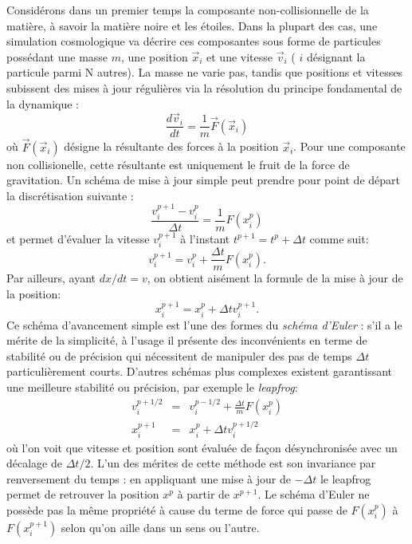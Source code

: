 Considérons dans un premier temps la composante non-collisionnelle de la matière, à savoir la matière noire et les étoiles. Dans la plupart des cas, une simulation cosmologique va décrire ces composantes sous forme de particules possédant une masse $m$, une position $\vec x_i$ et une vitesse $\vec v_i$ ( $i$ désignant la particule parmi N autres). La masse ne varie pas, tandis que positions et vitesses subissent des mises à jour régulières via la résolution du principe fondamental de la dynamique :
\begin{equation}
\frac{d \vec v_i}{dt}=\frac{1}{m} \vec{F}(\vec x_i)
\end{equation}
où $\vec{F}(\vec x_i)$ désigne la résultante des forces à la position $\vec x_i$. Pour une composante non collisionelle, cette résultante est uniquement le fruit de la force de gravitation. Un schéma de mise à jour simple peut prendre pour point de départ la discrétisation suivante :
\begin{equation}
\frac{v_i^{p+1}-v_i^{p}}{\Delta t}=\frac{1}{m} {F}(x_i^p)
\end{equation}
et permet d'évaluer la vitesse $v_i^{p+1}$ à l'instant $t^{p+1}=t^p+\Delta t$ comme suit:
\begin{equation}
v_i^{p+1}=v_i^{p}+\frac{\Delta t}{m} {F}(x_i^p).
\end{equation}
Par ailleurs, ayant $dx/dt=v$, on obtient aisément la formule de la mise à jour de la position:
\begin{equation}
x^{p+1}_i=x^{p}_i+\Delta t v_i^{p+1}.
\end{equation}
Ce schéma d'avancement simple est l'une des formes du \textit{schéma d'Euler} : s'il a le mérite de la simplicité, à l'usage il présente des inconvénients en terme de stabilité ou de précision qui nécessitent de manipuler des pas de temps $\Delta t$ particulièrement courts. D'autres schémas plus complexes existent garantissant une meilleure stabilité ou précision, par exemple le \textit{leapfrog}:
\begin{eqnarray}
v_i^{p+1/2}&=&v_i^{p-1/2}+\frac{\Delta t}{m} {F}(x_i^p)\\
x^{p+1}_i&=&x^{p}_i+\Delta t v_i^{p+1/2}
\end{eqnarray}
où l'on voit que vitesse et position sont évaluée de façon désynchronisée avec un décalage de $\Delta t/2$. L'un des mérites de cette méthode est son invariance par renversement du temps  : en appliquant une mise à jour de $-\Delta t$ le leapfrog permet de retrouver la position $x^p$ à partir de $x^{p+1}$. Le schéma d'Euler ne possède pas la même propriété à cause du terme de force qui passe de ${F}(x_i^p)$ à  ${F}(x_i^{p+1})$ selon qu'on aille dans un sens ou l'autre. 

